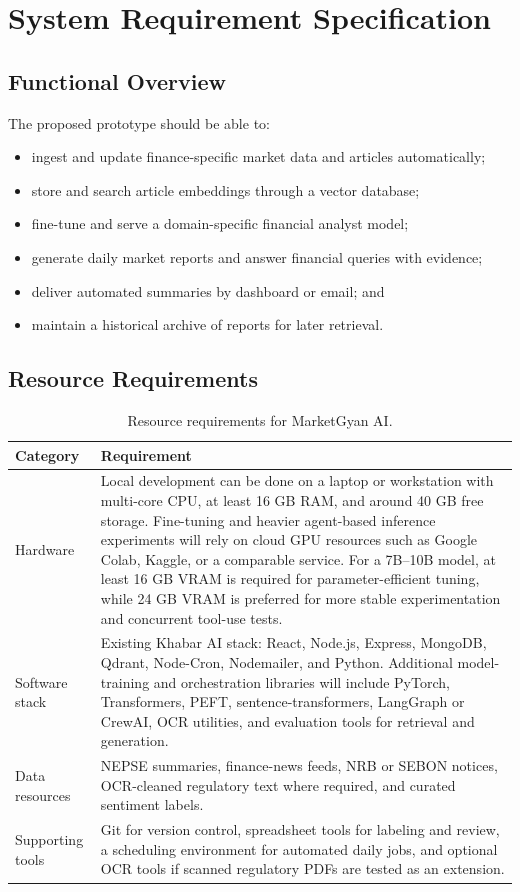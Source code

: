 \documentclass[12pt,a4paper]{report}
\begin{document}
\chapter{System Requirement Specification}

\section{Functional Overview}
The proposed prototype should be able to:
\begin{itemize}[leftmargin=1.6em]
    \item ingest and update finance-specific market data and articles automatically;
    \item store and search article embeddings through a vector database;
    \item fine-tune and serve a domain-specific financial analyst model;
    \item generate daily market reports and answer financial queries with evidence;
    \item deliver automated summaries by dashboard or email; and
    \item maintain a historical archive of reports for later retrieval.
\end{itemize}

\section{Resource Requirements}
\begin{table}[htbp]
\centering
\begin{tabularx}{\textwidth}{|p{3.1cm}|X|}
\hline
\textbf{Category} & \textbf{Requirement} \\
\hline
Hardware & Local development can be done on a laptop or workstation with multi-core CPU, at least 16 GB RAM, and around 40 GB free storage. Fine-tuning and heavier agent-based inference experiments will rely on cloud GPU resources such as Google Colab, Kaggle, or a comparable service. For a 7B--10B model, at least 16 GB VRAM is required for parameter-efficient tuning, while 24 GB VRAM is preferred for more stable experimentation and concurrent tool-use tests. \\
\hline
Software stack & Existing Khabar AI stack: React, Node.js, Express, MongoDB, Qdrant, Node-Cron, Nodemailer, and Python. Additional model-training and orchestration libraries will include PyTorch, Transformers, PEFT, sentence-transformers, LangGraph or CrewAI, OCR utilities, and evaluation tools for retrieval and generation. \\
\hline
Data resources & \ac{NEPSE} summaries, finance-news feeds, \ac{NRB} or \ac{SEBON} notices, OCR-cleaned regulatory text where required, and curated sentiment labels. \\
\hline
Supporting tools & Git for version control, spreadsheet tools for labeling and review, a scheduling environment for automated daily jobs, and optional OCR tools if scanned regulatory PDFs are tested as an extension. \\
\hline
\end{tabularx}
\caption{Resource requirements for MarketGyan AI.}
\label{tab:resources}
\end{table}
\end{document}
